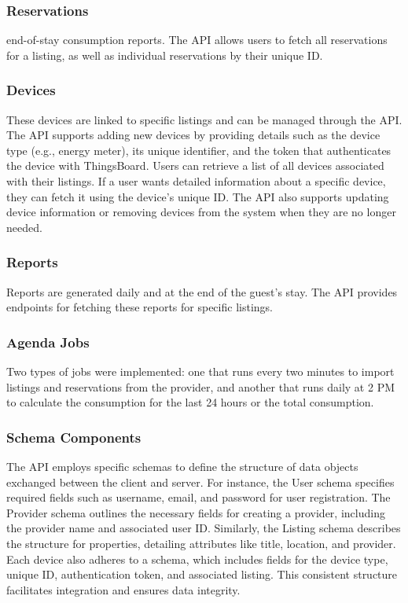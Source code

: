 \subsubsection{Reservations}

end-of-stay consumption reports. The API allows users to fetch all reservations for a listing, as well as individual 
reservations by their unique ID.

\subsubsection{Devices}

These devices are linked to specific listings and can be managed through the API. The API supports adding new devices 
by providing details such as the device type (e.g., energy meter), its unique identifier, and the token that 
authenticates the device with ThingsBoard. Users can retrieve a list of all devices associated with their listings. 
If a user wants detailed information about a specific device, they can fetch it using the device's unique ID. The API 
also supports updating device information or removing devices from the system when they are no longer needed.

\subsubsection{Reports}

Reports are generated daily and at the end of the guest's stay. The API provides endpoints for fetching these reports 
for specific listings.

\subsubsection{Agenda Jobs}

Two types of jobs were implemented: one that runs every two minutes to import listings and reservations from the 
provider, and another that runs daily at 2 PM to calculate the consumption for the last 24 hours or the total 
consumption.

\subsubsection{Schema Components}

The API employs specific schemas to define the structure of data objects exchanged between the client and server. For 
instance, the User schema specifies required fields such as username, email, and password for user registration. The 
Provider schema outlines the necessary fields for creating a provider, including the provider name and associated user 
ID. Similarly, the Listing schema describes the structure for properties, detailing attributes like title, location, 
and provider. Each device also adheres to a schema, which includes fields for the device type, unique ID, authentication 
token, and associated listing. This consistent structure facilitates integration and ensures data integrity.

